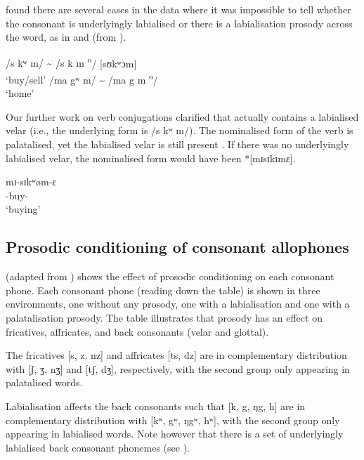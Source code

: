 \largerpage
\citet{Bow1997c} found there are several cases in the data where it was impossible to tell whether the consonant is underlyingly labialised or there is a labialisation prosody across the word, as in  and  (from \citealt{Bow1997c}).

\ea \label{ex:2:26}
\textup{/s kʷ m/ {\textasciitilde} /s k m \textsuperscript{o}}\textup{/   \ExampleSpace \hspace{15pt}    [sʊkʷɔm]}\\
\glt  ‘buy/sell’      
\z
\clearpage
\ea \label{ex:2:27}
\textup{/ma gʷ m/ {\textasciitilde}  /ma g m \textsuperscript{o}}\textup{/  \ExampleSpace [mɔgʷɔm]}\\
\glt  ‘home’
\z

Our further work on verb conjugations clarified that  actually contains a labialised velar (i.e., the underlying form is /s kʷ m/). The nominalised form of the verb is palatalised, yet the labialised velar is still present . If there was no underlyingly labialised velar, the nominalised form would have been *[mɪsɪkɪmɛ].

\ea \label{ex:2:28}
mɪ-sɪkʷøm-ɛ\\
      {\NOM}{}-buy-{\CL}\\
\glt  ‘buying’
\z

\subsection{Prosodic conditioning of consonant allophones}\label{sec:2.2.3}
\hypertarget{RefHeading1210501525720847}{}
 (adapted from \citealt{Bow1997c}) shows the effect of prosodic conditioning on each consonant phone.  Each consonant phone (reading down the table) is shown in three environments, one without any prosody, one with a labialisation and one with a palatalisation prosody. The table illustrates that prosody has an effect on fricatives, affricates, and back consonants (velar and glottal).

The fricatives [s, z, nz] and affricates [ts, dz] are in complementary distribution with [ʃ, ʒ, nʒ] and [tʃ, dʒ], respectively, with the second group only appearing in palatalised words.  

Labialisation affects the back consonants such that [k, g, ŋg, h] are in complementary distribution with [kʷ, gʷ, ŋgʷ, hʷ], with the second group only appearing in labialised words. Note however that there is a set of underlyingly labialised back consonant phonemes (see ).


